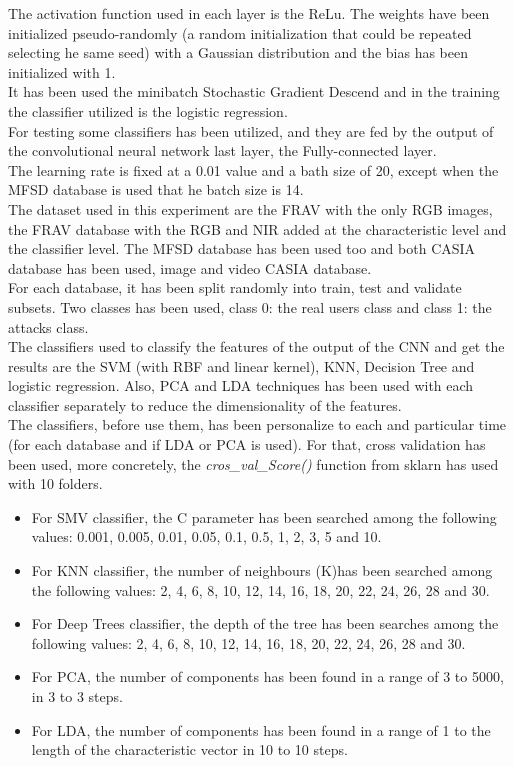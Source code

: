 The activation function used in each layer is the ReLu. The weights have been initialized pseudo-randomly (a random initialization that could be repeated selecting he same seed) with a Gaussian distribution and the bias has been initialized with 1.\\

It has been used the minibatch Stochastic Gradient Descend and in the training the classifier utilized is the logistic regression.\\

For testing some classifiers has been utilized, and they are fed by the output of the convolutional neural network last layer, the Fully-connected layer.\\

The learning rate is fixed at a 0.01 value and a bath size of 20, except when the MFSD database is used that he batch size is 14.\\

The dataset used in this experiment are the FRAV with the only RGB images, the FRAV database with the RGB and NIR added at the characteristic level  and  the classifier level. The MFSD database has been used too and both CASIA database has been used, image and video CASIA database.\\

For each database, it has been split randomly into train, test and validate subsets. Two classes has been used, class 0: the real users class and class 1: the attacks class.\\

The classifiers used to classify the features of the output of the CNN and get the results are the SVM (with RBF and linear kernel), KNN, Decision Tree and logistic regression. Also, PCA and LDA techniques has been used with each classifier separately to reduce the dimensionality of the features.\\

The classifiers, before use them, has been personalize to each and particular time (for each database and if LDA or PCA is used). For that, cross validation has been used, more concretely, the \textit{cros\_val\_Score()} function from sklarn has used with 10 folders.\\

\begin{itemize}
\item For SMV classifier, the C parameter has been searched among the following values: 0.001, 0.005, 0.01, 0.05, 0.1, 0.5, 1, 2, 3, 5 and 10.
\item For KNN classifier, the number of neighbours (K)has been searched among the following values: 2, 4, 6, 8, 10, 12, 14, 16, 18, 20, 22, 24, 26, 28 and 30.
\item For Deep Trees classifier, the depth of the tree has been searches among the following values: 2, 4, 6, 8, 10, 12, 14, 16, 18, 20, 22, 24, 26, 28 and 30.
\item For PCA, the number of components has been found in a range of 3 to 5000, in 3 to 3 steps.
\item For LDA, the number of components has been found in a range of 1 to the length of the characteristic vector in 10 to 10 steps.
\end{itemize}

